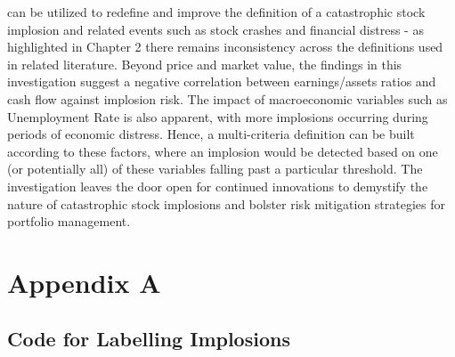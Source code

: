 \documentclass[a4paper]{report}
\begin{document}
can be utilized to redefine and improve the definition of a catastrophic stock implosion and related 
events such as stock crashes and financial distress - as highlighted in Chapter 2 there remains inconsistency across the definitions used in related literature. Beyond price and market value, 
the findings in this investigation suggest a negative correlation between earnings/assets ratios and cash flow against implosion risk. The impact of macroeconomic variables such as Unemployment Rate is also apparent, with 
more implosions occurring during periods of economic distress. Hence, a multi-criteria definition can be built according to these factors, where an implosion would be detected based on one (or potentially all) of these variables falling past a particular threshold. 
The investigation leaves the door open for continued innovations to demystify the nature of catastrophic stock implosions and bolster risk mitigation strategies for portfolio management.







 




\newpage
\appendix
\renewcommand{\thefigure}{A\arabic{figure}}
\renewcommand{\thetable}{A\arabic{table}} %
\chapter*{Appendix A} 


\section*{Code for Labelling Implosions}
\end{document}
